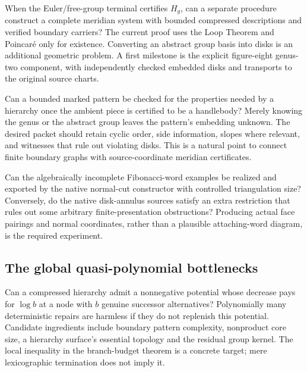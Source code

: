 \begin{question}
When the Euler/free-group terminal certifies $H_g$, can a separate procedure
construct a complete meridian system with bounded compressed descriptions and
verified boundary carriers? The current proof uses the Loop Theorem and
Poincar\'e only for existence. Converting an abstract group basis into disks is
an additional geometric problem. A first milestone is the explicit
figure-eight genus-two component, with independently checked embedded disks
and transports to the original source charts.
\end{question}

\begin{question}
Can a bounded marked pattern be checked for the properties needed by a
hierarchy once the ambient piece is certified to be a handlebody? Merely
knowing the genus or the abstract group leaves the pattern's embedding unknown.
The desired packet should retain cyclic order, side information, slopes where
relevant, and witnesses that rule out violating disks. This is a natural point
to connect finite boundary graphs with source-coordinate meridian certificates.
\end{question}

\begin{question}
Can the algebraically incomplete Fibonacci-word examples be realized and
exported by the native normal-cut constructor with controlled triangulation
size? Conversely, do the native disk-annulus sources satisfy an extra
restriction that rules out some arbitrary finite-presentation obstructions?
Producing actual face pairings and normal coordinates, rather than a plausible
attaching-word diagram, is the required experiment.
\end{question}

\subsection{The global quasi-polynomial bottlenecks}

\begin{question}
Can a compressed hierarchy admit a nonnegative potential whose decrease pays
for $\log b$ at a node with $b$ genuine successor alternatives? Polynomially
many deterministic repairs are harmless if they do not replenish this
potential. Candidate ingredients include boundary pattern complexity,
nonproduct core size, a hierarchy surface's essential topology and the residual
group kernel. The local inequality in the branch-budget theorem is a concrete
target; mere lexicographic termination does not imply it.
\end{question}


